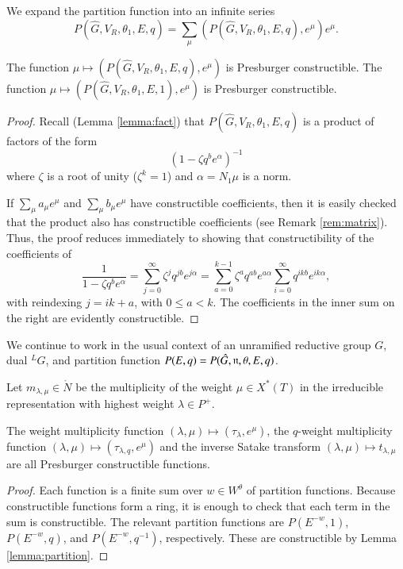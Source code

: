 We expand the partition function into an infinite series
\[
P(\hat G,V_R,\theta_1,E,q) = 
\sum_\mu (P(\hat G,V_R,\theta_1,E,q),e^\mu) e^{\mu}.
\]

\begin{lemma}\label{lemma:partition}
  The function $\mu\mapsto (P(\hat G,V_R,\theta_1,E,q),e^\mu)$ is
  Presburger constructible.  The function $\mu\mapsto (P(\hat
  G,V_R,\theta_1,E,1),e^\mu)$ is Presburger constructible.
\end{lemma}

\begin{proof} 
  Recall (Lemma \ref{lemma:fact}) that $P(\hat G,V_R,\theta_1,E,q)$ is
  a product of factors of the form
\[
(1- \zeta q^b e^\alpha)^{-1}
\]
where $\zeta$ is a root of unity ($\zeta^k=1$) and $\alpha = N_1\mu$
is a norm.

If $\sum_\mu a_\mu e^\mu$ and $\sum_\mu b_\mu e^\mu$ have
constructible coefficients, then it is easily checked that the product
also has constructible coefficients (see Remark \ref{rem:matrix}).
Thus, the proof reduces immediately to showing that constructibility
of the coefficients of
\[
\frac{1}{1-\zeta q^b e^\alpha} 
= \sum_{j=0}^\infty \zeta^j q^{j b} e^{j\alpha} = 
\sum_{a = 0}^{k-1} \zeta^a 
q^{a b} e^{a\alpha}\sum_{i=0}^\infty q^{i k b} e^{i k\alpha},
\]
with reindexing $j = i k + a$, with $0\le a < k$.  The coefficients in
the inner sum on the right are evidently constructible.
\end{proof}

We continue to work in the usual context of an unramified reductive
group $G$, dual ${}^LG$, and partition function $P(E,q)=P(\hat
G,{\mathfrak n},\theta,E,q)$.

Let $m_{\lambda,\mu}\in \ring{N}$ be the multiplicity of the weight
$\mu\in X^*(T)$ in the irreducible representation with highest weight
$\lambda\in P^+$.

\begin{lemma}  
  The weight multiplicity function $(\lambda,\mu)\mapsto
  (\tau_\lambda,e^\mu)$, the $q$-weight multiplicity function
  $(\lambda,\mu)\mapsto (\tau_{\lambda,q},e^\mu)$ and the inverse
  Satake transform $(\lambda,\mu)\mapsto t_{\lambda,\mu}$ are all
  Presburger constructible functions.
\end{lemma}

\begin{proof} 
  Each function is a finite sum over $w\in W^\theta$ of partition
  functions.  Because constructible functions form a ring, it is
  enough to check that each term in the sum is constructible.  The
  relevant partition functions are $P(E^{-w},1)$, $P(E^{-w},q)$,
  and $P(E^{-w},q^{-1})$, respectively.  These are constructible by
  Lemma \ref{lemma:partition}.
\end{proof}

